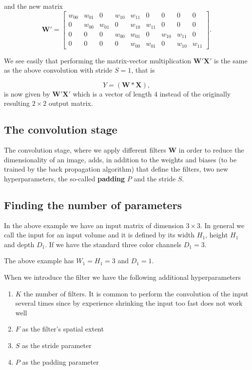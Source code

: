 \documentclass[%
oneside,                 %
final,                   %
10pt]{article}
\begin{document}
and the new matrix
\[
\bm{W}'=\begin{bmatrix} w_{00} & w_{01} & 0 & w_{10} & w_{11} & 0 & 0 & 0 & 0 \\
                        0  & w_{00} & w_{01} & 0 & w_{10} & w_{11} & 0 & 0 & 0 \\
			0 & 0 & 0 & w_{00} & w_{01} & 0 & w_{10} & w_{11} & 0  \\
                        0 & 0 & 0 & 0 & w_{00} & w_{01} & 0 & w_{10} & w_{11}\end{bmatrix}.
\]

We see easily that performing the matrix-vector multiplication $\bm{W}'\bm{X}'$ is the same as the above convolution with stride $S=1$, that is

\[
Y=(\bm{W}*\bm{X}),
\]
is now given by $\bm{W}'\bm{X}'$ which is a vector of length $4$ instead of the originally resulting  $2\times 2$ output matrix.

\subsection{The convolution stage}

The convolution stage, where we apply different filters $\bm{W}$ in
order to reduce the dimensionality of an image, adds, in addition to
the weights and biases (to be trained by the back propagation
algorithm) that define the filters, two new hyperparameters, the so-called
\textbf{padding} $P$ and the stride $S$.

\subsection{Finding the number of parameters}

In the above example we have an input matrix of dimension $3\times
3$. In general we call the input for an input volume and it is defined
by its width $H_1$, height $H_1$ and depth $D_1$. If we have the
standard three color channels $D_1=3$.

The above example has $W_1=H_1=3$ and $D_1=1$.

When we introduce the filter we have the following additional hyperparameters
\begin{enumerate}
\item $K$ the number of filters. It is common to perform the convolution of the input several times since by experience shrinking the input too fast does not work well

\item $F$ as the filter's spatial extent

\item $S$ as the stride parameter

\item $P$ as the padding parameter
\end{enumerate}
\end{document}
